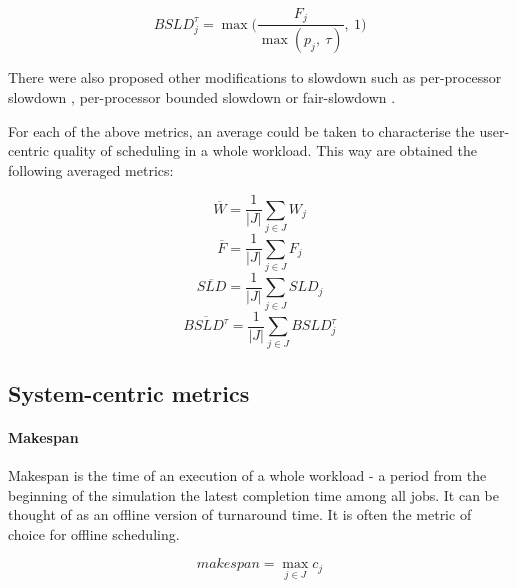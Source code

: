 \documentclass[thesis-en.tex]{subfiles}
\begin{document}
\begin{equation}
    BSLD_{j}^{\tau} = \max \biggl( 
    \frac{ F_j }{ \max (p_j,\ \tau) },\ 
    1 \biggl)
\end{equation}

There were also proposed other modifications to slowdown such as per-processor slowdown \cite{10.1007/3-540-45540-X_11}, per-processor bounded slowdown \cite{8752660} or fair-slowdown \cite{srinivasan2002selective}.

\bigskip

For each of the above metrics, an average could be taken to characterise the user-centric quality of scheduling in a whole workload. This way are obtained the following averaged metrics:

\begin{equation}
    \overline{W} = \frac{1}{|J|} \sum_{j \in J} W_j
\end{equation}
\begin{equation}
    \overline{F} = \frac{1}{|J|} \sum_{j \in J} F_j
\end{equation}
\begin{equation}
    \overline{SLD} = \frac{1}{|J|} \sum_{j \in J} SLD_j
\end{equation}
\begin{equation}
    \overline{BSLD^{\tau}} = \frac{1}{|J|} \sum_{j \in J} BSLD_{j}^{\tau}
\end{equation}

\subsection{System-centric metrics}
\paragraph{Makespan}
Makespan is the time of an execution of a whole workload - a period from the beginning of the simulation the latest completion time among all jobs. It can be thought of as an offline version of turnaround time. It is often the metric of choice for offline scheduling.

\begin{equation} \label{eq:makespan}
    makespan = \max_{j \in J} c_j
\end{equation}
\end{document}
